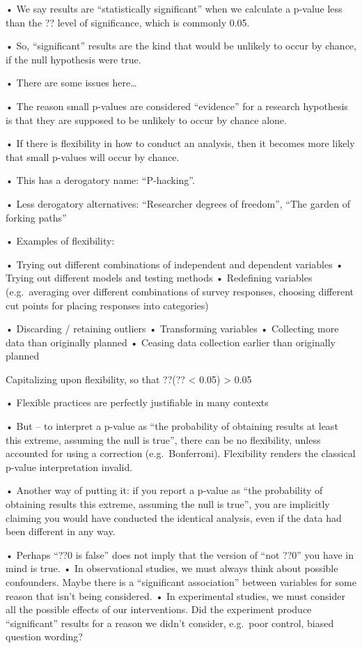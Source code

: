 \documentclass[
  letterpaper,
  DIV=11,
  numbers=noendperiod]{scrreprt}
\begin{document}
• We say results are ``statistically significant'' when we calculate a
p-value less than the ?? level of significance, which is commonly 0.05.

• So, ``significant'' results are the kind that would be unlikely to
occur by chance, if the null hypothesis were true.

• There are some issues here\ldots{}

• The reason small p-values are considered ``evidence'' for a research
hypothesis is that they are supposed to be unlikely to occur by chance
alone.

• If there is flexibility in how to conduct an analysis, then it becomes
more likely that small p-values will occur by chance.

• This has a derogatory name: ``P-hacking''.

• Less derogatory alternatives: ``Researcher degrees of freedom'', ``The
garden of forking paths''

• Examples of flexibility:

• Trying out different combinations of independent and dependent
variables • Trying out different models and testing methods • Redefining
variables (e.g.~averaging over different combinations of survey
responses, choosing different cut points for placing responses into
categories)

• Discarding / retaining outliers • Transforming variables • Collecting
more data than originally planned • Ceasing data collection earlier than
originally planned

Capitalizing upon flexibility, so that ??(?? \textless{} 0.05)
\textgreater{} 0.05

• Flexible practices are perfectly justifiable in many contexts

• But -- to interpret a p-value as ``the probability of obtaining
results at least this extreme, assuming the null is true'', there can be
no flexibility, unless accounted for using a correction
(e.g.~Bonferroni). Flexibility renders the classical p-value
interpretation invalid.

• Another way of putting it: if you report a p-value as ``the
probability of obtaining results this extreme, assuming the null is
true'', you are implicitly claiming you would have conducted the
identical analysis, even if the data had been different in any way.

• Perhaps ``??0 is false'' does not imply that the version of ``not
??0'' you have in mind is true. • In observational studies, we must
always think about possible confounders. Maybe there is a ``significant
association'' between variables for some reason that isn't being
considered. • In experimental studies, we must consider all the possible
effects of our interventions. Did the experiment produce ``significant''
results for a reason we didn't consider, e.g.~poor control, biased
question wording?
\end{document}
